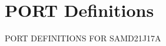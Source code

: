 \hypertarget{group___s_a_m_d21_j17_a__port}{}\section{P\+O\+RT Definitions}
\label{group___s_a_m_d21_j17_a__port}
P\+O\+RT D\+E\+F\+I\+N\+I\+T\+I\+O\+NS F\+OR S\+A\+M\+D21\+J17A 